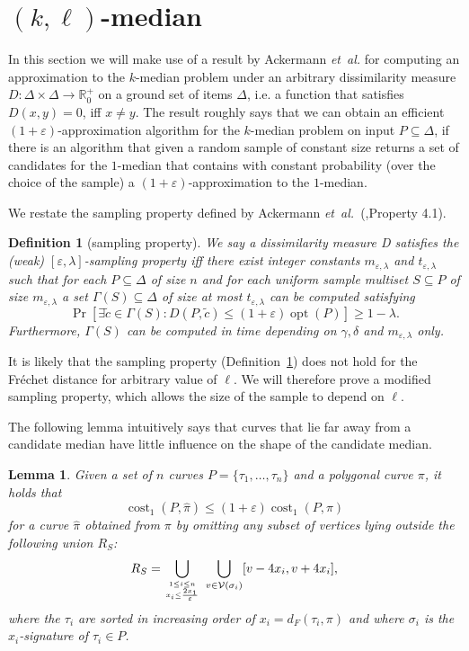 \documentclass[11pt, letter]{article}
\newcommand{\etal}{\textit{e{}t~a{}l.}\xspace}
\DeclareMathOperator{\cost}{cost}
\DeclareMathOperator{\opt}{opt}
\newtheorem{definition}[theorem]{Definition}
\newtheorem{lemma}[theorem]{Lemma}
\newcommand{\lemlab}[1]{\label{lemma:#1}}
\newcommand{\deflab}[1]{\label{def:#1}}
\newcommand{\defref}[1]{Definition~\ref{def:#1}}
\newcommand{\Frechet}{Fr\'echet\xspace}
\providecommand{\eps}{{\varepsilon}}\newcommand{\Astop}{\overline{a}}
\providecommand{\pth}[2][\!]{#1\left({#2}\right)}
\newcommand{\nrClusters}{\ensuremath{k}}
\newcommand{\lenClusters}{\ensuremath{\ell}}
\newcommand{\trajectory}[2]{\ensuremath{{#1}_{#2}}}
\newcommand{\inputSym}{\ensuremath{\tau}}
\newcommand{\inputTraj}[1]{\trajectory{\inputSym}{#1}}
\newcommand{\VtxSet}{\ensuremath{\mathcal{V}}}
\newcommand{\distFr}[2]{\ensuremath{d_F\pth{#1,#2}}}
\begin{document}
\section{$(\nrClusters,\lenClusters)$-median}

In this section we will make use of a result by Ackermann \etal \cite{abs-cm-10} for 
computing an approximation to the $k$-median problem under an arbitrary dissimilarity
measure $D:\Delta \times \Delta \rightarrow \mathbb{R}_0^+$ on a ground set of items $\Delta$, i.e. a 
function that satisfies $D(x,y) = 0$, iff $x \not= y$. The result roughly says that
we can obtain an efficient $(1+\varepsilon)$-approximation algorithm for the $k$-median
problem on input $P \subseteq \Delta$, if there is an algorithm that given a random sample 
of constant size returns
a set of candidates for the $1$-median that contains with constant probability (over the
choice of the sample) a $(1+\varepsilon)$-approximation to the $1$-median.

We restate the sampling property defined by Ackermann \etal~(\cite{abs-cm-10},Property 4.1).

\begin{definition}[sampling property]
\deflab{sampling:property}
We say a dissimilarity measure D satisfies the (weak)
$[\eps,\lambda]$-sampling property iff there exist integer constants
$m_{\eps,\lambda}$ and $t_{\eps,\lambda}$ such that for each $P\subseteq \Delta$
of size $n$ and for each uniform sample multiset $S\subseteq P$ of size $m_{\eps,\lambda}$ a set 
$\Gamma(S) \subseteq \Delta$ of size at most $t_{\eps,\lambda}$ can be computed satisfying
\[\Pr\left[ \exists \tilde{c} \in \Gamma(S) : D(P,\tilde{c}) \leq (1+\eps) \opt(P) \right] \geq 1-\lambda.\]
Furthermore, $\Gamma(S)$ can be computed in time depending on $\gamma,\delta$ and $m_{\eps,\lambda}$ only.
\end{definition} 

It is likely that the sampling property
(\defref{sampling:property}) does not hold for the \Frechet distance for
arbitrary value of $\lenClusters$. We will therefore prove a modified sampling
property, which allows the size of the sample to depend on $\lenClusters$.

The following lemma intuitively says that curves that lie far away from a candidate median 
have little influence on the shape of the candidate median.

\begin{lemma}\lemlab{omit:far:away}
Given a set of $n$ curves $P=\{\tau_1,\ldots, \tau_n\}$ and a polygonal curve $\pi$, it holds that 
\[\cost_{1}(P,\widehat{\pi}) \leq (1+\eps)\cost_{1}(P,\pi) \] 
for a curve $\widehat{\pi}$ obtained from $\pi$ by omitting any subset of vertices lying outside 
the following union $R_S$:\[
R_S = \bigcup_{ 1\leq i \leq n \atop x_i \leq \frac{2x_1}{\eps} }\; \bigcup_{v \in \VtxSet(\sigma_i) } [v-4x_i,v+4x_i],
\]
where the $\tau_i$ are sorted in increasing order of $x_i=\distFr{\inputTraj{i}}{\pi}$ and where
$\sigma_i$ is the $x_i$-signature of $\inputTraj{i} \in P$. \end{lemma}
\end{document}
